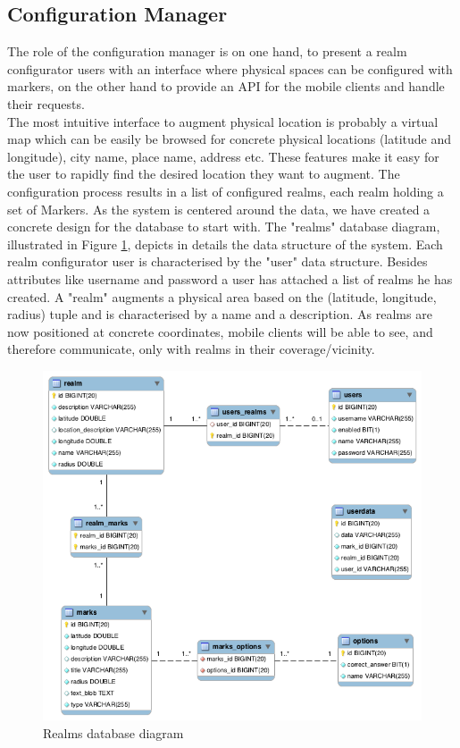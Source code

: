\subsection{Configuration Manager} %
\label{sub:configuration_manager}
\noindent The role of the configuration manager is on one hand, to present a realm configurator users with an interface where physical spaces can be configured with markers, on the other hand to provide an API for the mobile clients and handle their requests.
\\
The most intuitive interface to augment physical location is probably a virtual map which can be easily be browsed for concrete physical locations (latitude and longitude), city name, place name, address etc. These features make it easy for the user to rapidly find the desired location they want to augment. The configuration process results in a list of configured realms, each realm holding a set of Markers. As the system is centered around the data, we have created a concrete design for the database to start with. The  "realms" database diagram, illustrated in Figure \ref{fig.db_structure}, depicts in details the data structure of the system. Each realm configurator user is characterised by the "user" data structure. Besides attributes like username and password a user has attached a list of realms he has created. A "realm" augments a physical area based on the (latitude, longitude, radius) tuple and is characterised by a name and a description. As realms are now positioned at concrete coordinates, mobile clients will be able to see, and therefore communicate, only with realms in their coverage/vicinity.
\begin{figure}[H]
	\centering
	\includegraphics[width=1.0\linewidth]{fig/db_structure}
	\caption{Realms database diagram}
	\label{fig.db_structure}
\end{figure}
